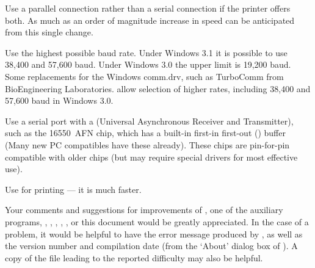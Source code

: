 \bpar Use a parallel connection rather than a serial connection if the
printer offers both. 
As much as an order of magnitude increase in speed can be anticipated
from this single change. 

\bpar Use the highest possible baud rate.  
Under Windows 3.1 it is possible to use 38,400 and 57,600 baud.
Under Windows 3.0 the upper limit is 19,200 baud.
Some replacements for the Windows {\sc comm.drv}, 
such as Turbo\-Comm from Bio\-Engineering Laboratories.
allow selection of higher rates, 
including 38,400 and 57,600 baud in Windows 3.0.


\bpar Use a serial port with a {\UART} 
(Universal Asynchronous Receiver and Transmitter),
such as the 16550~AFN chip,
which has a built-in first-in first-out ({\FIFO}) buffer
(Many new PC compatibles have these already).
These chips are pin-for-pin compatible with older {\UART} chips
(but may require special drivers %
for most effective use).




\bpar Use {\DVIPSONE} for printing --- it is much faster.


\endbullets


Your comments and suggestions for improvements of {\DVIWindo}, one of
the auxiliary programs, 
{\AFMTOTFM}, {\AFMTOPFM}, {\REENCODE}, {\TIFFTAGS}, {\CLEANUP},
or this document would be greatly appreciated.  
In the case of a problem, it would be helpful to have the %
error message produced by {\DVIWindo}, 
as well as the version number and compilation date
(from the `About' dialog box of {\DVIWindo}).
A copy of the {\DVI} file leading to the reported difficulty 
may also be helpful.

